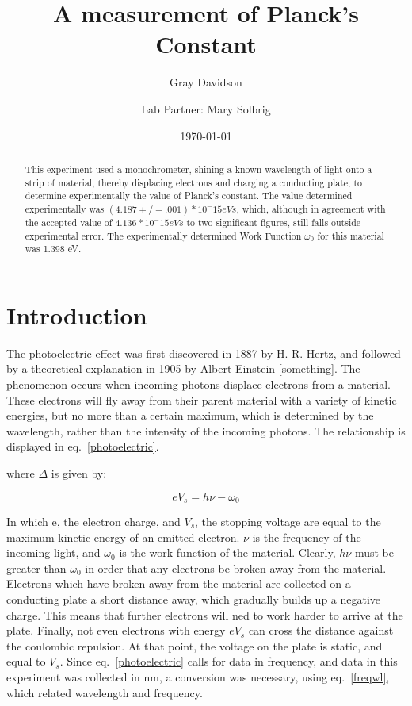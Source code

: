 \documentclass[aps,pre,twocolumn,nofootinbib]{revtex4}
\begin{document}
\title{A measurement of Planck's Constant}

\author{Gray Davidson}
\author{Lab Partner: Mary Solbrig }

\date{\today}

\begin{abstract}  
This experiment used a monochrometer, shining a known wavelength of light onto a strip of material, thereby displacing electrons and charging a conducting plate, to determine experimentally the value of Planck's constant.  The value determined experimentally was $(4.187 +/- .001)*10^-15 eV s$, which, although in agreement with the accepted value of $4.136*10^-15 eV s$ to two significant figures, still falls outside experimental error.  The experimentally determined Work Function $\omega_0$ for this material was 1.398 eV.  
\end{abstract}
\maketitle

\section{Introduction}
The photoelectric effect was first discovered in 1887 by H. R. Hertz, and followed by a theoretical explanation in 1905 by Albert Einstein \ref{something}.  The phenomenon occurs when incoming photons displace electrons from a material.  These electrons will fly away from their parent material with a variety of kinetic energies, but no more than a certain maximum, which is determined by the wavelength, rather than the intensity of the incoming photons.  The relationship is displayed in eq.~\ref{photoelectric}.

where $\Delta$ is given by:

\begin{equation}
\label{photoelectric}
e V_s=h \nu-\omega_0
\end{equation}

In which e, the electron charge, and $V_s$, the stopping voltage are equal to the maximum kinetic energy of an emitted electron.  $\nu$ is the frequency of the incoming light, and $\omega_0$ is the work function of the material.  Clearly, $h\nu$ must be greater than $\omega_0$ in order that any electrons be broken away from the material.  Electrons which have broken away from the material are collected on a conducting plate a short distance away, which gradually builds up a negative charge.  This means that further electrons will ned to work harder to arrive at the plate.  Finally, not even electrons with energy $eV_s$ can cross the distance against the coulombic repulsion.  At that point, the voltage on the plate is static, and equal to $V_s$.  Since eq.~\ref{photoelectric} calls for data in frequency, and data in this experiment was collected in nm, a conversion was necessary, using eq.~\ref{freqwl}, which related wavelength and frequency.  
\end{document}
